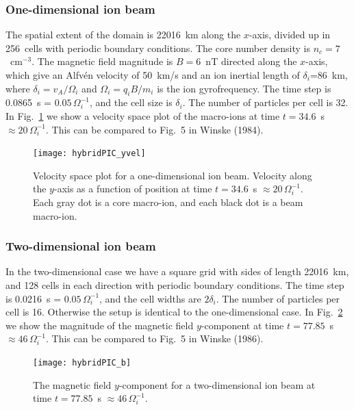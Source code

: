 \subsubsection{One-dimensional ion beam}
The spatial extent of the domain is 22016~km along the $x$-axis, 
divided up in 256~cells with periodic boundary conditions.  
The core number density is $n_c=7$~cm$^{-3}$. 
The magnetic field magnitude is $B=6$~nT directed along the $x$-axis, 
which give an Alfv\'{e}n velocity of 50~km/s and an ion inertial length 
of $\delta_i$=86~km, where $\delta_i=v_A/\Omega_i$ 
and $\Omega_i=q_iB/m_i$ is the ion gyrofrequency. 
The time step is 0.0865~s = $0.05\,\Omega_i^{-1}$, and the cell 
size is $\delta_i$. The number of particles per cell is 32. 
In Fig.~\ref{fig:beam} we show a velocity space plot of the 
macro-ions at time $t=34.6$~s $\approx 20\,\Omega_i^{-1}$. 
This can be compared to Fig.~5 in Winske (1984). 
\begin{figure}[ht]
\begin{center}
  \texttt{[image: hybridPIC\_yvel]}
\end{center}
\caption{Velocity space plot for a one-dimensional ion beam. 
Velocity along the $y$-axis as a function of position at time 
$t=34.6$~s $\approx 20\,\Omega_i^{-1}$.
Each gray dot is a core macro-ion, and each black dot is a beam macro-ion. 
} \label{fig:beam} %
\end{figure}

\subsubsection{Two-dimensional ion beam}
In the two-dimensional case we have a square grid with sides of length 
22016~km, and 128 cells in each direction with periodic boundary conditions. 
The time step is 0.0216~s = $0.05\,\Omega_i^{-1}$, and the cell 
widths are $2\delta_i$.  
The number of particles per cell is 16. 
Otherwise the setup is identical to the one-dimensional case. 
In Fig.~\ref{fig:2d} we show the magnitude of the magnetic field 
$y$-component at time $t=77.85$~s $\approx 46\,\Omega_i^{-1}$.
This can be compared to Fig.~5 in Winske (1986). 
\begin{figure}[ht]
\begin{center}
  \texttt{[image: hybridPIC\_b]}
\end{center}
\caption{The magnetic field $y$-component for a 
two-dimensional ion beam at time $t=77.85$~s $\approx 46\,\Omega_i^{-1}$. 
} \label{fig:2d} %
\end{figure}


